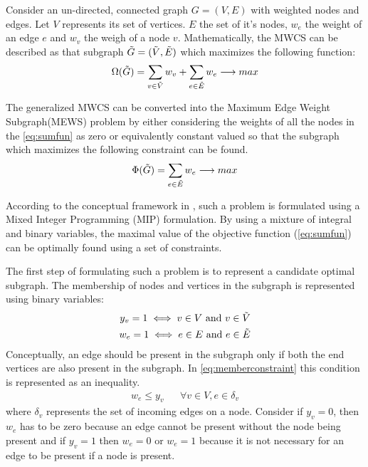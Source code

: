 \documentclass[msthesis.tex]{subfiles}
\begin{document}
Consider an un-directed, connected graph $G = (V,E)$ with weighted nodes and edges. Let $V$ represents its set of vertices. $E$ the set of it's nodes, $w_e$ the weight of an edge $e$ and $w_v$ the weigh of a node $v$. Mathematically, the MWCS can be described as that subgraph  $\Tilde{G} = (\Tilde{V}, \Tilde{E})$ which maximizes the following function:
\begin{equation}
\label{eq:sumfun}
    \Omega(\Tilde{G}) = \sum_{v \in \Tilde{V}} w_v + \sum_{e \in \Tilde{E}} w_e \longrightarrow max
\end{equation}

The generalized MWCS can be converted into the Maximum Edge Weight Subgraph(MEWS) problem by either considering the weights of all the nodes in the  \autoref{eq:sumfun} as zero or equivalently constant valued so that the subgraph which maximizes the following constraint can be found.
\begin{equation}
    \label{eq:sumews}
    \Phi(\Tilde{G}) = \sum_{e \in \Tilde{E}} w_e \longrightarrow max
\end{equation}

According to the conceptual framework in \cite{DBLP:journals/corr/LobodaAS16}, such a problem is formulated using a Mixed Integer Programming (MIP) formulation. By using  a mixture of integral and binary variables, the maximal value of the objective function (\autoref{eq:sumfun}) can be optimally found using a set of constraints.

The first step of formulating such a problem is to represent a candidate optimal subgraph. The membership of nodes and vertices in the subgraph is represented using binary variables:
\begin{align}
    \label{eq:y_v}
    y_v = 1  \iff v \in V  \textrm{ and } v \in \Tilde{V} \\
    \label{eq:w_e}
    w_e =1  \iff e \in E  \textrm{  and }  e \in \Tilde{E}
\end{align}
Conceptually, an edge should be present in the subgraph only if both the end vertices are also present in the subgraph. In \autoref{eq:memberconstraint} this condition is represented as an inequality.
\begin{align}
    \label{eq:memberconstraint}
    w_e \leq y_v && \forall v \in V, e \in \delta_{v}
\end{align}
where $\delta_{v}$ represents the set of incoming edges on a node. Consider if $y_v = 0$, then $w_e$ has to be zero because an edge cannot be present without the node being present and if $y_v = 1$ then $w_e = 0$ or $w_e = 1$ because it is not necessary for an edge to be present if a node is present.
\end{document}
